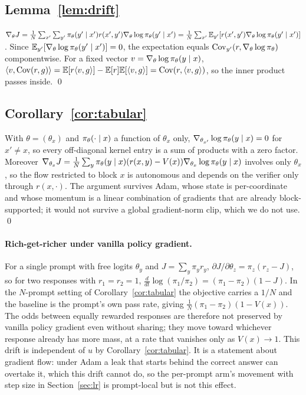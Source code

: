 \subsection{Lemma~\ref{lem:drift}}

$\nabla_\theta J = \frac1N\sum_{x'}\sum_{y'}\pi_\theta(y'\mid x')r(x',y')\nabla_\theta\log\pi_\theta(y'\mid x') = \frac1N\sum_{x'}\mathbb{E}_{y'}[r(x',y')\nabla_\theta\log\pi_\theta(y'\mid x')]$. Since $\mathbb{E}_{y'}[\nabla_\theta\log\pi_\theta(y'\mid x')]=0$, the expectation equals $\operatorname{Cov}_{y'}(r,\nabla_\theta\log\pi_\theta)$ componentwise. For a fixed vector $v=\nabla_\theta\log\pi_\theta(y\mid x)$, $\langle v,\operatorname{Cov}(r,g)\rangle = \mathbb{E}[r\langle v,g\rangle]-\mathbb{E}[r]\mathbb{E}[\langle v,g\rangle]=\operatorname{Cov}(r,\langle v,g\rangle)$, so the inner product passes inside. \qed

\subsection{Corollary~\ref{cor:tabular}}

With $\theta=(\theta_x)$ and $\pi_\theta(\cdot\mid x)$ a function of $\theta_x$ only, $\nabla_{\theta_{x'}}\log\pi_\theta(y\mid x)=0$ for $x'\neq x$, so every off-diagonal kernel entry is a sum of products with a zero factor. Moreover $\nabla_{\theta_x}J=\frac1N\sum_y\pi_\theta(y\mid x)(r(x,y)-V(x))\nabla_{\theta_x}\log\pi_\theta(y\mid x)$ involves only $\theta_x$, so the flow restricted to block $x$ is autonomous and depends on the verifier only through $r(x,\cdot)$. The argument survives Adam, whose state is per-coordinate and whose momentum is a linear combination of gradients that are already block-supported; it would not survive a global gradient-norm clip, which we do not use. \qed

\paragraph{Rich-get-richer under vanilla policy gradient.} For a single prompt with free logits $\theta_y$ and $J=\sum_y\pi_y r_y$, $\partial J/\partial\theta_z = \pi_z(r_z-J)$, so for two responses with $r_1=r_2=1$, $\frac{d}{dt}\log(\pi_1/\pi_2)=(\pi_1-\pi_2)(1-J)$. In the $N$-prompt setting of Corollary~\ref{cor:tabular} the objective carries a $1/N$ and the baseline is the prompt's own pass rate, giving $\frac1N(\pi_1-\pi_2)(1-V(x))$. The odds between equally rewarded responses are therefore not preserved by vanilla policy gradient even without sharing; they move toward whichever response already has more mass, at a rate that vanishes only as $V(x)\to1$. This drift is independent of $u$ by Corollary~\ref{cor:tabular}. It is a statement about gradient flow: under Adam a leak that starts behind the correct answer can overtake it, which this drift cannot do, so the per-prompt arm's movement with step size in Section~\ref{sec:lr} is prompt-local but is not this effect.


